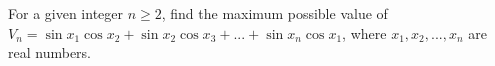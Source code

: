 For a given integer $n \ge  2$, find the maximum possible value of $V_n = \sin x_1 \cos x_2 +\sin x_2 \cos x_3 +...+\sin x_n \cos x_1$, where $x_1,x_2,...,x_n$ are real numbers.